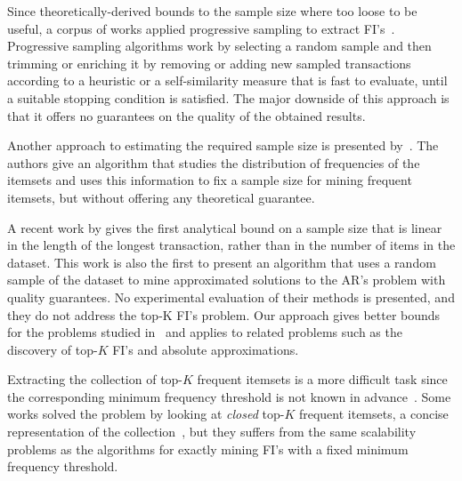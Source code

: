 Since theoretically-derived bounds to the sample size where too loose to be
useful, a corpus of works applied progressive sampling to extract
FI's~\citep{JohnL96,ChenHS02,Parthasarathy02,BronnimanCDHS03,ChuangCY05,JiaG05,WangDC05,HwangK06,HuY06,MahafzahABAZ09,ChenHH11,ChandraB11}.
Progressive sampling algorithms work by selecting a random sample and then
trimming or enriching it by removing or adding new sampled transactions
according to a heuristic or a self-similarity measure that is fast to evaluate,
until a suitable stopping condition is satisfied. The major downside of this
approach is that it offers no guarantees on the quality of the obtained results.

Another approach to estimating the required sample size is presented
by~\citet{ChuangHC08}. The authors give an algorithm that studies the
distribution of frequencies of the itemsets and uses this information to fix a
sample size for mining frequent itemsets, but without offering any theoretical
guarantee.

A recent work by \citet{ChakaravarthyPS09} gives the first
analytical bound on a sample size that is linear in the length of the longest
transaction, rather than in the number of items in the dataset.  This work is
also the first to present an algorithm that uses a random sample of the dataset
to mine approximated solutions to the AR's problem with quality guarantees. No
experimental evaluation of their methods is presented, and they do not address
the top-K FI's problem. Our approach gives better bounds for the problems
studied in~\citep{ChakaravarthyPS09} and applies to related problems such as the
discovery of top-$K$ FI's and absolute approximations.

Extracting the collection of top-$K$ frequent itemsets is a more difficult task
since the corresponding minimum frequency threshold is not known in
advance~\citep{CheungF04,FuKT00}. Some works solved the problem by looking at
\emph{closed} top-$K$ frequent itemsets, a concise representation of the
collection~\citep{WangHLT05,PietracaprinaV07}, but they suffers from the same
scalability problems as the algorithms for exactly mining FI's with a fixed
minimum frequency threshold.

